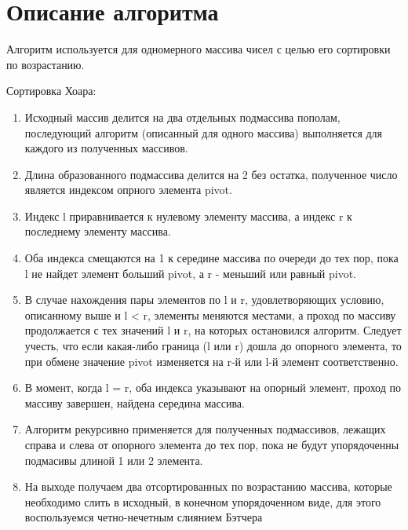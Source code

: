 \documentclass{report}
\begin{document}
\section*{Описание алгоритма}
\par Алгоритм используется для одномерного массива чисел с целью его сортировки по возрастанию.
\par Сортировка Хоара:
\begin{enumerate}
  \item Исходный массив делится на два отдельных подмассива пополам, последующий алгоритм (описанный для одного массива) выполняется для каждого из полученных массивов.
  \item Длина образованного подмассива делится на 2 без остатка, полученное число является индексом опрного элемента pivot.
  \item Индекс l приравнивается к нулевому элементу массива, а индекс r к последнему элементу массива.
  \item Оба индекса смещаются на 1 к середине массива по очереди до тех пор, пока l не найдет элемент больший pivot, а r - меньший или равный pivot.
  \item В случае нахождения пары элементов по l и r, удовлетворяющих условию, описанному выше и l < r, элементы меняются местами, а проход по массиву продолжается с тех значений l и r, на которых остановился алгоритм.
  Следует учесть, что если какая-либо граница (l или r) дошла до опорного элемента, то при обмене значение pivot изменяется на r-й или l-й элемент соответственно.
  \item В момент, когда l = r, оба индекса указывают на опорный элемент, проход по массиву завершен, найдена середина массива. 
  \item Алгоритм рекурсивно применяется для полученных подмассивов, лежащих справа и слева от опорного элемента до тех пор, пока не будут упорядоченны подмасивы длиной 1 или 2 элемента.
  \item На выходе получаем два отсортированных по возрастанию массива, которые необходимо слить в исходный, в конечном упорядоченном виде, для этого воспользуемся четно-нечетным слиянием Бэтчера
\end{enumerate}
\newpage
\end{document}
